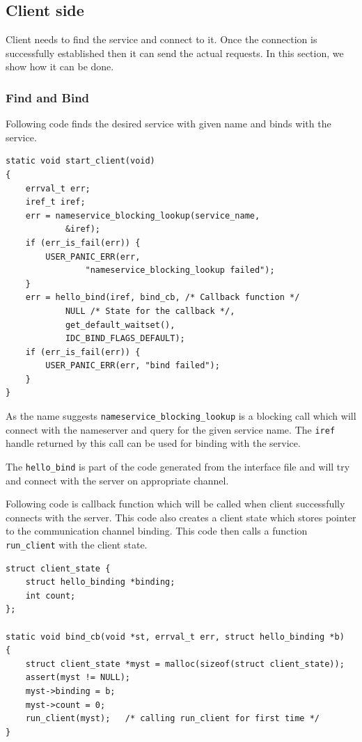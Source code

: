 \subsection{Client side}
Client needs to find the service and connect to it.  Once the connection
is successfully established then it can send the actual requests. In this
section, we show how it can be done.


\subsubsection{Find and Bind}
Following code finds the desired service with given name and binds with
the service.

\begin{verbatim}
static void start_client(void)
{
    errval_t err;
    iref_t iref;
    err = nameservice_blocking_lookup(service_name,
            &iref);
    if (err_is_fail(err)) {
        USER_PANIC_ERR(err,
                "nameservice_blocking_lookup failed");
    }
    err = hello_bind(iref, bind_cb, /* Callback function */
            NULL /* State for the callback */,
            get_default_waitset(),
            IDC_BIND_FLAGS_DEFAULT);
    if (err_is_fail(err)) {
        USER_PANIC_ERR(err, "bind failed");
    }
}
\end{verbatim}

As the name suggests  \texttt{nameservice\_blocking\_lookup} is a blocking
call which will connect with the nameserver and query for the given
service name.  The \texttt{iref} handle returned by this call can be used
for binding with the service.

The \texttt{hello\_bind} is part of the code generated from the interface
file and will try and connect with the server on appropriate channel.

Following code is callback function which will be called when client
successfully connects with the server.  This code also creates a client
state which stores pointer to the communication channel binding.  This code
then calls a function \texttt{run\_client} with the client state.


\begin{verbatim}
struct client_state {
    struct hello_binding *binding;
    int count;
};

static void bind_cb(void *st, errval_t err, struct hello_binding *b)
{
    struct client_state *myst = malloc(sizeof(struct client_state));
    assert(myst != NULL);
    myst->binding = b;
    myst->count = 0;
    run_client(myst);   /* calling run_client for first time */
}
\end{verbatim}


